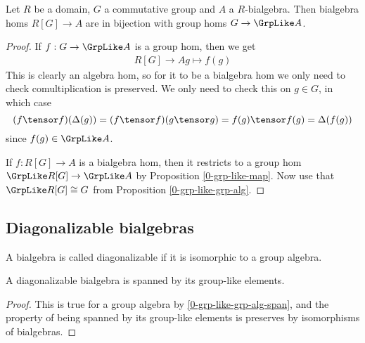 \begin{proposition}
  \label{0-grp-alg-grp-like-gc}

  Let $R$ be a domain, $G$ a commutative group and $A$ a $R$-bialgebra.
  Then bialgebra homs $R[G] \to A$ are in bijection with group homs $G \to \GrpLike A$.
\end{proposition}
\begin{proof}

  If $f : G \to \GrpLike A$ is a group hom, then we get
  \begin{align*}
    R[G] \to A
    g \mapsto f(g)
  \end{align*}
  This is clearly an algebra hom,
  so for it to be a bialgebra hom we only need to check comultiplication is preserved.
  We only need to check this on $g \in G$, in which case
  \[(f \tensor f)(\Delta(g)) = (f \tensor f)(g \tensor g) = f(g) \tensor f(g) = \Delta(f(g))\]
  since $f(g) \in \GrpLike A$.

  If $f : R[G] \to A$ is a bialgebra hom,
  then it restricts to a group hom $\GrpLike R[G] \to \GrpLike A$
  by Proposition \ref{0-grp-like-map}.
  Now use that $\GrpLike R[G] \cong G$ from Proposition \ref{0-grp-like-grp-alg}.
\end{proof}


\subsection{Diagonalizable bialgebras}


\begin{definition}
  \label{0-is-diag-bialg}
  \uses{}
  \leanok

  A bialgebra is called diagonalizable if it is isomorphic to a group algebra.
\end{definition}


\begin{lemma}
  \label{0-is-diag-bialg-group-like-span}
  \leanok

  A diagonalizable bialgebra is spanned by its group-like elements.
\end{lemma}
\begin{proof}
  \leanok

  This is true for a group algebra by \ref{0-grp-like-grp-alg-span}, and the
  property of being spanned by its group-like elements is preserves by
  isomorphisms of bialgebras.
\end{proof}


